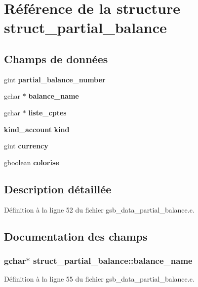 \section{Référence de la structure struct\_\-partial\_\-balance}
\label{structstruct__partial__balance}
\subsection*{Champs de données}
\begin{DoxyCompactItemize}
\item 
gint {\bf partial\_\-balance\_\-number}
\item 
gchar $\ast$ {\bf balance\_\-name}
\item 
gchar $\ast$ {\bf liste\_\-cptes}
\item 
{\bf kind\_\-account} {\bf kind}
\item 
gint {\bf currency}
\item 
gboolean {\bf colorise}
\end{DoxyCompactItemize}


\subsection{Description détaillée}


Définition à la ligne 52 du fichier gsb\_\-data\_\-partial\_\-balance.c.



\subsection{Documentation des champs}
\subsubsection[{balance\_\-name}]{\setlength{\rightskip}{0pt plus 5cm}gchar$\ast$ {\bf struct\_\-partial\_\-balance::balance\_\-name}}\label{structstruct__partial__balance_a919a6569c84fd1417b42ad69c9a6480d}


Définition à la ligne 55 du fichier gsb\_\-data\_\-partial\_\-balance.c.

